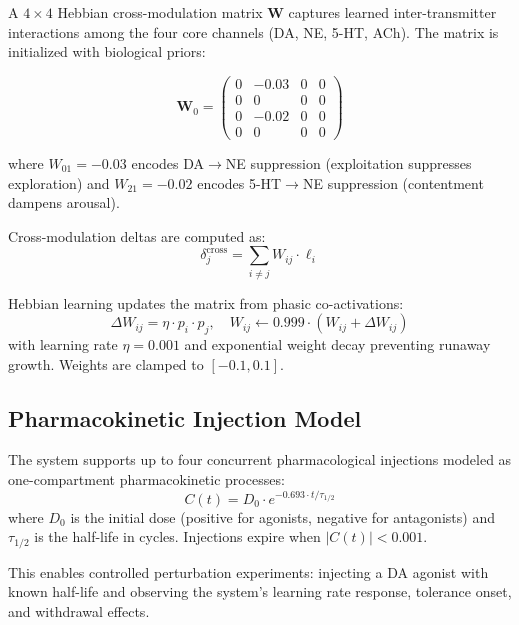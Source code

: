 \documentclass[11pt,a4paper]{article}
\begin{document}
A $4 \times 4$ Hebbian cross-modulation matrix $\mathbf{W}$ captures learned inter-transmitter interactions among the four core channels (DA, NE, 5-HT, ACh). The matrix is initialized with biological priors:

\begin{equation}
\mathbf{W}_0 = \begin{pmatrix}
0 & -0.03 & 0 & 0 \\
0 & 0 & 0 & 0 \\
0 & -0.02 & 0 & 0 \\
0 & 0 & 0 & 0
\end{pmatrix}
\end{equation}

\noindent where $W_{01} = -0.03$ encodes DA$\to$NE suppression (exploitation suppresses exploration) and $W_{21} = -0.02$ encodes 5-HT$\to$NE suppression (contentment dampens arousal).

Cross-modulation deltas are computed as:
\begin{equation}
\delta_j^{\text{cross}} = \sum_{i \neq j} W_{ij} \cdot \ell_i
\end{equation}

Hebbian learning updates the matrix from phasic co-activations:
\begin{equation}
\Delta W_{ij} = \eta \cdot p_i \cdot p_j, \quad W_{ij} \leftarrow 0.999 \cdot (W_{ij} + \Delta W_{ij})
\end{equation}
with learning rate $\eta = 0.001$ and exponential weight decay preventing runaway growth. Weights are clamped to $[-0.1, 0.1]$.

\subsection{Pharmacokinetic Injection Model}

The system supports up to four concurrent pharmacological injections modeled as one-compartment pharmacokinetic processes:
\begin{equation}
C(t) = D_0 \cdot e^{-0.693 \cdot t / \tau_{1/2}}
\end{equation}
where $D_0$ is the initial dose (positive for agonists, negative for antagonists) and $\tau_{1/2}$ is the half-life in cycles. Injections expire when $|C(t)| < 0.001$.

This enables controlled perturbation experiments: injecting a DA agonist with known half-life and observing the system's learning rate response, tolerance onset, and withdrawal effects.
\end{document}
